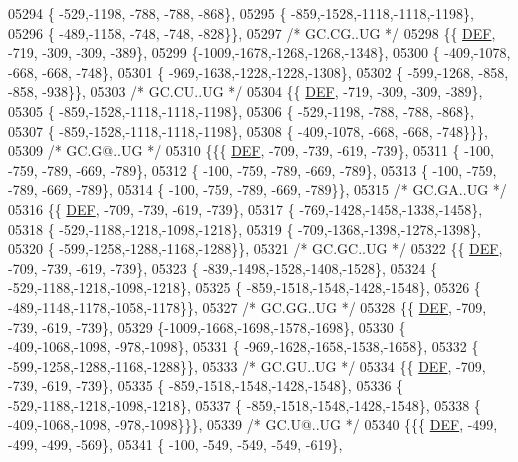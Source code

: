 \begin{DoxyCode}
05294 \{ -529,-1198, -788, -788, -868\},
05295 \{ -859,-1528,-1118,-1118,-1198\},
05296 \{ -489,-1158, -748, -748, -828\}\},
05297 \textcolor{comment}{/* GC.CG..UG */}
05298 \{\{  \mbox{\hyperlink{1_88_84__epars_8h_a397419fc12b37ed479c8abb9d444d843}{DEF}}, -719, -309, -309, -389\},
05299 \{-1009,-1678,-1268,-1268,-1348\},
05300 \{ -409,-1078, -668, -668, -748\},
05301 \{ -969,-1638,-1228,-1228,-1308\},
05302 \{ -599,-1268, -858, -858, -938\}\},
05303 \textcolor{comment}{/* GC.CU..UG */}
05304 \{\{  \mbox{\hyperlink{1_88_84__epars_8h_a397419fc12b37ed479c8abb9d444d843}{DEF}}, -719, -309, -309, -389\},
05305 \{ -859,-1528,-1118,-1118,-1198\},
05306 \{ -529,-1198, -788, -788, -868\},
05307 \{ -859,-1528,-1118,-1118,-1198\},
05308 \{ -409,-1078, -668, -668, -748\}\}\},
05309 \textcolor{comment}{/* GC.G@..UG */}
05310 \{\{\{  \mbox{\hyperlink{1_88_84__epars_8h_a397419fc12b37ed479c8abb9d444d843}{DEF}}, -709, -739, -619, -739\},
05311 \{ -100, -759, -789, -669, -789\},
05312 \{ -100, -759, -789, -669, -789\},
05313 \{ -100, -759, -789, -669, -789\},
05314 \{ -100, -759, -789, -669, -789\}\},
05315 \textcolor{comment}{/* GC.GA..UG */}
05316 \{\{  \mbox{\hyperlink{1_88_84__epars_8h_a397419fc12b37ed479c8abb9d444d843}{DEF}}, -709, -739, -619, -739\},
05317 \{ -769,-1428,-1458,-1338,-1458\},
05318 \{ -529,-1188,-1218,-1098,-1218\},
05319 \{ -709,-1368,-1398,-1278,-1398\},
05320 \{ -599,-1258,-1288,-1168,-1288\}\},
05321 \textcolor{comment}{/* GC.GC..UG */}
05322 \{\{  \mbox{\hyperlink{1_88_84__epars_8h_a397419fc12b37ed479c8abb9d444d843}{DEF}}, -709, -739, -619, -739\},
05323 \{ -839,-1498,-1528,-1408,-1528\},
05324 \{ -529,-1188,-1218,-1098,-1218\},
05325 \{ -859,-1518,-1548,-1428,-1548\},
05326 \{ -489,-1148,-1178,-1058,-1178\}\},
05327 \textcolor{comment}{/* GC.GG..UG */}
05328 \{\{  \mbox{\hyperlink{1_88_84__epars_8h_a397419fc12b37ed479c8abb9d444d843}{DEF}}, -709, -739, -619, -739\},
05329 \{-1009,-1668,-1698,-1578,-1698\},
05330 \{ -409,-1068,-1098, -978,-1098\},
05331 \{ -969,-1628,-1658,-1538,-1658\},
05332 \{ -599,-1258,-1288,-1168,-1288\}\},
05333 \textcolor{comment}{/* GC.GU..UG */}
05334 \{\{  \mbox{\hyperlink{1_88_84__epars_8h_a397419fc12b37ed479c8abb9d444d843}{DEF}}, -709, -739, -619, -739\},
05335 \{ -859,-1518,-1548,-1428,-1548\},
05336 \{ -529,-1188,-1218,-1098,-1218\},
05337 \{ -859,-1518,-1548,-1428,-1548\},
05338 \{ -409,-1068,-1098, -978,-1098\}\}\},
05339 \textcolor{comment}{/* GC.U@..UG */}
05340 \{\{\{  \mbox{\hyperlink{1_88_84__epars_8h_a397419fc12b37ed479c8abb9d444d843}{DEF}}, -499, -499, -499, -569\},
05341 \{ -100, -549, -549, -549, -619\},

\end{DoxyCode}
